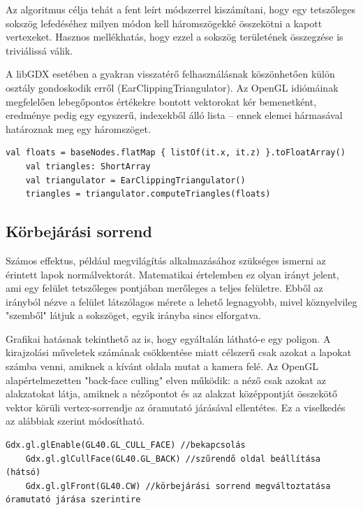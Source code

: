 Az algoritmus célja tehát a fent leírt módszerrel kiszámítani, hogy egy tetszőleges sokszög lefedéséhez milyen módon kell háromszögekké összekötni a kapott vertexeket. Hasznos mellékhatás, hogy ezzel a sokszög területének összegzése is triviálissá válik.

A libGDX esetében a gyakran visszatérő felhasználásnak köszönhetően külön osztály gondoskodik erről (EarClippingTriangulator). Az OpenGL idiómáinak megfelelően lebegőpontos értékekre bontott vektorokat kér bemenetként, eredménye pedig egy egyszerű, indexekből álló lista -- ennek elemei hármasával határoznak meg egy háromszöget.

\begin{lstlisting}[caption=Példa az EarClippingTriangulator felhasználására]
    val floats = baseNodes.flatMap { listOf(it.x, it.z) }.toFloatArray()
    val triangles: ShortArray
    val triangulator = EarClippingTriangulator()
    triangles = triangulator.computeTriangles(floats)
\end{lstlisting}

\subsection{Körbejárási sorrend}

Számos effektus, például megvilágítás alkalmazásához szükséges ismerni az érintett lapok normálvektorát. Matematikai értelemben ez olyan irányt jelent, ami egy felület tetszőleges pontjában merőleges a teljes felületre. Ebből az irányból nézve a felület látszólagos mérete a lehető legnagyobb, mivel köznyelvileg "szemből" látjuk a sokszöget, egyik irányba sincs elforgatva.

Grafikai hatásnak tekinthető az is, hogy egyáltalán látható-e egy poligon. A kirajzolási műveletek számának csökkentése miatt célszerű csak azokat a lapokat számba venni, amiknek a kívánt oldala mutat a kamera felé. Az OpenGL alapértelmezetten "back-face culling" elven működik: a néző csak azokat az alakzatokat látja, amiknek a nézőpontot és az alakzat középpontját összekötő vektor körüli vertex-sorrendje az óramutató járásával ellentétes. Ez a viselkedés az alábbiak szerint módosítható.

\begin{lstlisting}[caption=Példa az OpenGL culling műveleteinek beállításaira libGDX-en keresztül]
    Gdx.gl.glEnable(GL40.GL_CULL_FACE) //bekapcsolás
    Gdx.gl.glCullFace(GL40.GL_BACK) //szűrendő oldal beállítása (hátsó)
    Gdx.gl.glFront(GL40.CW) //körbejárási sorrend megváltoztatása óramutató járása szerintire
\end{lstlisting}

